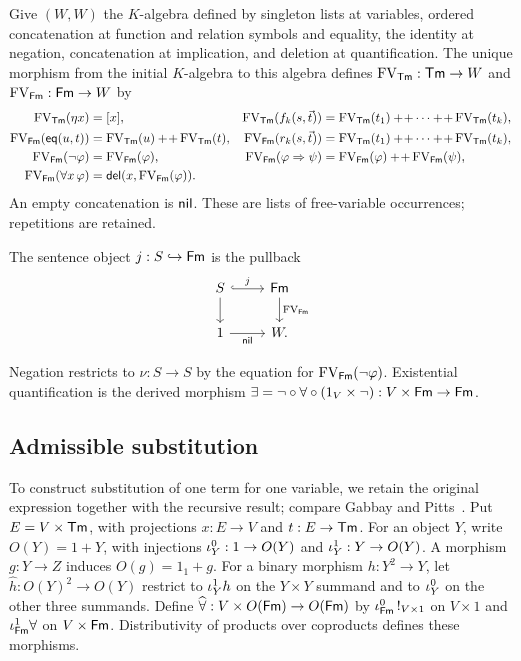 Give $(W,W)$ the $K$-algebra defined by singleton lists at variables,
ordered concatenation at function and relation symbols and equality,
the identity at negation, concatenation at implication, and deletion
at quantification. The unique morphism from the initial $K$-algebra to this algebra
defines $\operatorname{FV}_{\mathsf{Tm}}:\mathsf{Tm}\to W$ and $\operatorname{FV}_{\mathsf{Fm}}:\mathsf{Fm}\to W$ by
\begin{align*}
 \operatorname{FV}_{\mathsf{Tm}}(\eta x)&=[x],&
 \operatorname{FV}_{\mathsf{Tm}}(f_k(s,\vec t))&=\operatorname{FV}_{\mathsf{Tm}}(t_1)+\!+\cdots+\!+\operatorname{FV}_{\mathsf{Tm}}(t_k),\\
 \operatorname{FV}_{\mathsf{Fm}}(\mathsf{eq}(u,t))&=\operatorname{FV}_{\mathsf{Tm}}(u)+\!+\operatorname{FV}_{\mathsf{Tm}}(t),&
 \operatorname{FV}_{\mathsf{Fm}}(r_k(s,\vec t))&=\operatorname{FV}_{\mathsf{Tm}}(t_1)+\!+\cdots+\!+\operatorname{FV}_{\mathsf{Tm}}(t_k),\\
 \operatorname{FV}_{\mathsf{Fm}}(\neg\varphi)&=\operatorname{FV}_{\mathsf{Fm}}(\varphi),&
 \operatorname{FV}_{\mathsf{Fm}}(\varphi\Rightarrow\psi)&=\operatorname{FV}_{\mathsf{Fm}}(\varphi)+\!+\operatorname{FV}_{\mathsf{Fm}}(\psi),\\
 \operatorname{FV}_{\mathsf{Fm}}(\forall x\,\varphi)&=\mathsf{del}(x,\operatorname{FV}_{\mathsf{Fm}}(\varphi)).&&
\end{align*}
An empty concatenation is $\mathsf{nil}$. These are lists of free-variable
occurrences; repetitions are retained.

\begin{definition}\label{def:sentence-object}
The sentence object $j:S\hookrightarrow\mathsf{Fm}$ is the pullback
\[
\begin{tikzcd}
 S\arrow[r,hook,"j"]\arrow[d] & \Fm\arrow[d,"\FV_{\Fm}"]\\
 1\arrow[r,"\nil"'] & W.
\end{tikzcd}
\]
\end{definition}
Negation restricts to $\nu:S\to S$ by the equation for
$\operatorname{FV}_{\mathsf{Fm}}(\neg\varphi)$. Existential quantification is the derived morphism
$\exists=\neg\circ\forall\circ(1_V\times\neg):V\times\mathsf{Fm}\to\mathsf{Fm}$.

\subsection{Admissible substitution}
\label{app:substitution}

To construct substitution of one term for one variable, we retain
the original expression together with the recursive result; compare
Gabbay and Pitts~\cite[proof of Corollary 6.7]{GabbayPitts}. Put $E=V\times\mathsf{Tm}$, with projections
$x:E\to V$ and $t:E\to\mathsf{Tm}$. For an object $Y$, write
$O(Y)=1+Y$, with injections $\iota^{0}_Y:1\to O(Y)$ and
$\iota^{1}_Y:Y\to O(Y)$. A morphism $g:Y\to Z$ induces
$O(g)=1_1+g$. For a binary morphism $h:Y^2\to Y$, let
$\widehat h:O(Y)^2\to O(Y)$ restrict to $\iota^{1}_Yh$ on the
$Y\times Y$ summand and to $\iota^{0}_Y$ on the other three summands.
Define $\widehat\forall:V\times O(\mathsf{Fm})\to O(\mathsf{Fm})$ by
$\iota^{0}_{\mathsf{Fm}}\,!_{V\times1}$ on $V\times1$ and $\iota^{1}_{\mathsf{Fm}}\forall$ on
$V\times\mathsf{Fm}$.
Distributivity of products over coproducts defines these morphisms.

